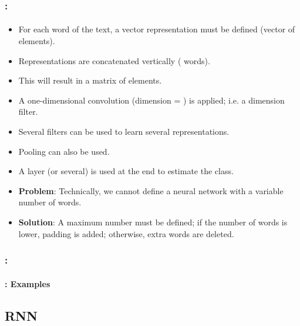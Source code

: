 \documentclass[xcolor=table]{beamer}
\begin{document}
\begin{frame}
	\frametitle{\insertshortsubtitle: \insertsection}
	\framesubtitle{\insertsubsection}
	
	\begin{itemize}
		\item For each word of the text, a vector representation must be defined (vector of  elements).
		\item Representations are concatenated vertically ( words).
		\item This will result in a matrix of  elements.
		\item A one-dimensional convolution (dimension = ) is applied; i.e. a  dimension filter.
		\item Several filters can be used to learn several representations.
		\item Pooling can also be used.
		\item A  layer (or several) is used at the end to estimate the class.
		\item \textbf{Problem}: Technically, we cannot define a neural network with a variable number of words.
		\item \textbf{Solution}: \textcolor{yellow!30}{A maximum number must be defined; if the number of words is lower, padding is added; otherwise, extra words are deleted.}
	\end{itemize}
	
\end{frame}

\begin{frame}
	\frametitle{\insertshortsubtitle: \insertsection}
	\framesubtitle{\insertsubsection: Examples}
	
	
\end{frame}


\subsection{RNN}
\end{document}
